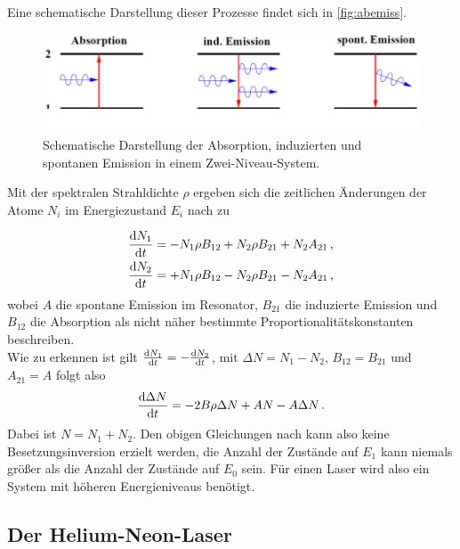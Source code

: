 Eine schematische Darstellung dieser Prozesse findet sich in \autoref{fig:abemiss}.

\begin{figure}[H]
    \centering
    \includegraphics{figures/Absorption_Emission.pdf}
    \caption{Schematische Darstellung der Absorption, induzierten und spontanen Emission in einem Zwei-Niveau-System.}
    \label{fig:abemiss}
\end{figure}

Mit der spektralen Strahldichte $\rho$ ergeben sich die zeitlichen Änderungen der Atome $N_i$ im Energiezustand $E_i$ nach \cite{dem01} zu

\begin{align}
    \frac{\mathrm{d} N_1}{\mathrm{d} t} &= - N_1 \rho B_{12} + N_2 \rho B_{21} + N_2 A_{21} \label{eq:dN1} \,, \\
    \frac{\mathrm{d} N_2}{\mathrm{d} t} &= + N_1 \rho B_{12} - N_2 \rho B_{21} - N_2 A_{21} \label{eq:dN2} \,, 
\end{align}
wobei $A$ die spontane Emission im Resonator, $B_{21}$ die induzierte Emission und $B_{12}$ die Absorption als nicht näher bestimmte Proportionalitätskonstanten beschreiben. \\
Wie zu erkennen ist gilt $\frac{\mathrm{d} N_1}{\mathrm{d} t} = -\frac{\mathrm{d} N_2}{\mathrm{d} t}$, mit $\Delta N = N_1 - N_2$, $B_{12} = B_{21}$ und $A_{21} = A$ folgt also
\begin{equation}
    \frac{\mathrm{d} \Delta N}{\mathrm{d} t} = - 2 B \rho \Delta N + A N - A \Delta N \,.
    \label{eq:deltaN}
\end{equation}
Dabei ist $N = N_1 + N_2$.
Den obigen Gleichungen nach kann also keine Besetzungsinversion erzielt werden, die Anzahl der Zustände auf $E_1$ kann niemals größer als die Anzahl der Zustände auf $E_0$ sein.
Für einen Laser wird also ein System mit höheren Energieniveaus benötigt.

\subsection{Der Helium-Neon-Laser}

